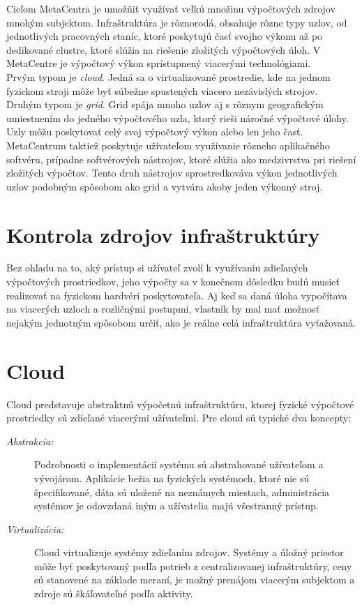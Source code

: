 \documentclass[12pt,twoside,color,cover,table]{fithesis3}
\begin{document}
Cieľom MetaCentra je umožňiť využívať veľkú množinu výpočtových zdrojov mnohým subjektom. Infraštruktúra je rôznorodá, obsahuje rôzne typy uzlov, od jednotlivých pracovných staníc, ktoré poskytujú
časť svojho výkonu až po dedikované clustre, ktoré slúžia na riešenie zložitých výpočtových úloh. V MetaCentre je výpočtový výkon sprístupnený viacerými technológiami.
\\Prvým typom je \textit{cloud}. Jedná sa o virtualizované prostredie, kde na jednom fyzickom stroji môže byť súbežne spustených viacero nezávislých strojov.
\\Druhým typom je \textit{grid}. Grid spája mnoho uzlov aj s rôznym geografickým umiestnením do jedného výpočtového uzla, ktorý rieši náročné výpočtové úlohy. Uzly môžu poskytovať celý svoj výpočtový výkon
alebo len jeho časť.
\\MetaCentrum taktiež poskytuje užívateľom využívanie rôzneho aplikačného softvéru, prípadne softvérových nástrojov, ktoré slúžia ako medzivrstva pri riešení zložitých výpočtov. Tento druh nástrojov
sprostredkováva výkon jednotlivých uzlov podobným spôsobom ako grid a vytvára akoby jeden výkonný stroj.

\section{Kontrola zdrojov infraštruktúry}
Bez ohľadu na to, aký prístup si užívateľ zvolí k využívaniu zdieľaných výpočtových prostriedkov, jeho výpočty sa v konečnom dôsledku budú musieť realizovať na fyzickom hardvéri poskytovateľa. 
Aj keď sa daná úloha vypočítava na viacerých uzloch a rozličnými postupmi, vlastník by mal mať možnosť nejakým jednotným spôsobom určiť, ako je reálne celá infraštruktúra vyťažovaná.

\section{Cloud}
Cloud predstavuje abstraktnú výpočetnú infraštruktúru, ktorej fyzické výpočtové prostriedky sú zdieľané viacerými užívateľmi. 
Pre cloud sú typické dva koncepty:
\begin{description}
\item[\emph{Abstrakcia:}] Podrobnosti o implementácií systému sú abstrahované užívateľom a vývojárom. Aplikácie bežia na fyzických systémoch,
ktoré nie sú špecifikované, dáta sú uložené na neznámych miestach, administrácia systémov je odovzdaná iným a užívatelia majú
všestranný prístup.
\item[\emph{Virtualizácia:}] Cloud virtualizuje systémy zdieľaním zdrojov. Systémy a úložný priestor môže byť poskytovaný podľa potrieb z 
centralizovanej infraštruktúry, ceny sú stanovené na základe meraní, je možný prenájom viacerým subjektom a zdroje sú škáľovateľné podľa aktivity.
\end{description}
\end{document}
